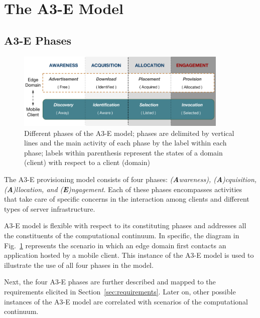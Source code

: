 \section{The A3-E Model}\label{sec:proposal}



\subsection{A3-E Phases}

\begin{figure}[htbp]
	\includegraphics[width=0.9\textwidth]{figs/A3-E.png}
	\caption{Different phases of the A3-E model; phases are delimited by vertical lines and the main activity of each phase by the label within each phase; labels within parenthesis represent the states of a domain (client) with respect to a client (domain)}
	\label{fig:A3-E-model}
\end{figure}

The A3-E provisioning model consists of four phases: \textit{(\textbf{A}wareness), (\textbf{A})cquisition, (\textbf{A})llocation, and (\textbf{E})ngagement}. Each of these phases encompasses activities that take care of specific concerns in the interaction among clients and different types of server infrastructure. 


A3-E model is flexible with respect to its constituting phases and addresses all the constituents of the computational continuum. In specific, the diagram in Fig.~\ref{fig:A3-E-model} represents the scenario in which an edge domain first contacts an application hosted by a mobile client. This instance of the A3-E model is used to illustrate the use of all four phases in the model. 

Next, the four A3-E phases are further described and mapped to the requirements elicited in  Section~\ref{sec:requirements}. Later on, other possible instances of the A3-E model are correlated with scenarios of the computational continuum.

